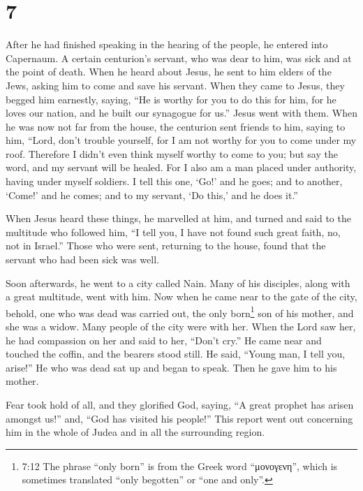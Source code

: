 \hypertarget{section-6}{%
\section{7}\label{section-6}}

 After he had finished speaking in the hearing of the
people, he entered into Capernaum.  A certain centurion's
servant, who was dear to him, was sick and at the point of death.
 When he heard about Jesus, he sent to him elders of the
Jews, asking him to come and save his servant.  When they
came to Jesus, they begged him earnestly, saying, ``He is worthy for you
to do this for him,  for he loves our nation, and he built
our synagogue for us.''  Jesus went with them. When he was
now not far from the house, the centurion sent friends to him, saying to
him, ``Lord, don't trouble yourself, for I am not worthy for you to come
under my roof.  Therefore I didn't even think myself worthy
to come to you; but say the word, and my servant will be healed.
 For I also am a man placed under authority, having under
myself soldiers. I tell this one, `Go!' and he goes; and to another,
`Come!' and he comes; and to my servant, `Do this,' and he does it.''

 When Jesus heard these things, he marvelled at him, and
turned and said to the multitude who followed him, ``I tell you, I have
not found such great faith, no, not in Israel.''  Those who
were sent, returning to the house, found that the servant who had been
sick was well.

 Soon afterwards, he went to a city called Nain. Many of
his disciples, along with a great multitude, went with him.
 Now when he came near to the gate of the city, behold, one
who was dead was carried out, the only born\footnote{7:12 The phrase
  ``only born'' is from the Greek word ``μονογενη'', which is sometimes
  translated ``only begotten'' or ``one and only''.} son of his mother,
and she was a widow. Many people of the city were with her.
 When the Lord saw her, he had compassion on her and said
to her, ``Don't cry.''  He came near and touched the
coffin, and the bearers stood still. He said, ``Young man, I tell you,
arise!''  He who was dead sat up and began to speak. Then
he gave him to his mother.

 Fear took hold of all, and they glorified God, saying, ``A
great prophet has arisen amongst us!'' and, ``God has visited his
people!''  This report went out concerning him in the whole
of Judea and in all the surrounding region.

